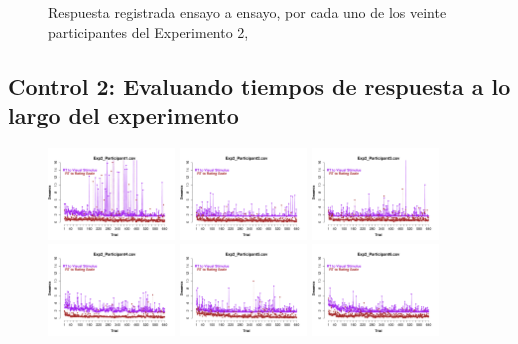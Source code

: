 \begin{itemize}
\begin{figure}[th]
\caption[Rating_Exp2]{Respuesta registrada ensayo a ensayo, por cada uno de los veinte participantes del Experimento 2, }
\label{fig:Rating_E2}
\end{figure}

\end{itemize}



\subsection{Control 2: Evaluando tiempos de respuesta a lo largo del experimento}


\begin{figure}[th]
\centering
\includegraphics[width=0.30\textwidth]{Figures/RTs_Exp2_P1} \includegraphics[width=0.30\textwidth]{Figures/RTs_Exp2_P2} \includegraphics[width=0.30\textwidth]{Figures/RTs_Exp2_P3}
\includegraphics[width=0.30\textwidth]{Figures/RTs_Exp2_P4} \includegraphics[width=0.30\textwidth]{Figures/RTs_Exp2_P5} \includegraphics[width=0.30\textwidth]{Figures/RTs_Exp2_P6}

\end{figure}
